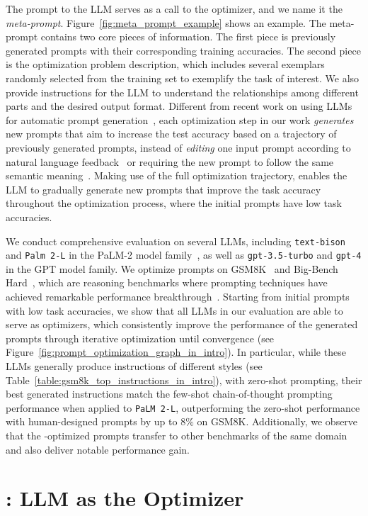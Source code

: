 The prompt to the LLM serves as a call to the optimizer, and we name it the \emph{meta-prompt}. 
Figure~\ref{fig:meta_prompt_example} shows an example.
The meta-prompt contains two core pieces of information.
The first piece is previously generated prompts with their corresponding training accuracies. 
The second piece is the optimization problem description, which includes several exemplars randomly selected from the training set to exemplify the task of interest.
We also provide instructions for the LLM to understand the relationships among different parts and the desired output format.
Different from recent work on using LLMs for automatic prompt generation~\citep{zhou2022large,pryzant2023automatic}, each optimization step in our work \emph{generates} new prompts that aim to increase the test accuracy based on a trajectory of previously generated prompts, instead of \emph{editing} one input prompt according to natural language feedback~\citep{pryzant2023automatic} or requiring the new prompt to follow the same semantic meaning~\citep{zhou2022large}.
Making use of the full optimization trajectory, \name{} enables the LLM to gradually generate new prompts that improve the task accuracy throughout the optimization process, where the initial prompts have low task accuracies.

We conduct comprehensive evaluation on several LLMs, including \texttt{text-bison} and \texttt{Palm 2-L} in the PaLM-2 model family~\citep{anil2023palm}, as well as \texttt{gpt-3.5-turbo} and \texttt{gpt-4} in the GPT model family. 
We optimize prompts on GSM8K~\citep{cobbe2021training} and Big-Bench Hard~\citep{suzgun2022challenging}, which are reasoning benchmarks where prompting techniques have achieved remarkable performance breakthrough~\citep{wei2022chain,kojima2022large,suzgun2022challenging}. Starting from initial prompts with low task accuracies, we show that all LLMs in our evaluation are able to serve as optimizers, which consistently improve the performance of the generated prompts through iterative optimization until convergence (see Figure~\ref{fig:prompt_optimization_graph_in_intro}). 
In particular, while these LLMs generally produce instructions of different styles (see Table~\ref{table:gsm8k_top_instructions_in_intro}), with zero-shot prompting, their best generated instructions match the few-shot chain-of-thought prompting performance when applied to \texttt{PaLM 2-L}, outperforming the zero-shot performance with human-designed prompts by up to $8\%$ on GSM8K.
Additionally, we observe that the \name{}-optimized prompts transfer to other benchmarks of the same domain and also deliver notable performance gain.\section{\name{}: LLM as the Optimizer}
\label{sec:approach}

